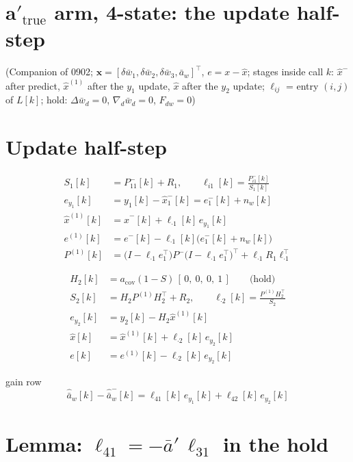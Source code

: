 \documentclass[11pt,a4paper,fontset=none]{ctexart}
\newcommand{\ba}{\bar{a}}
\newcommand{\bw}{\bar{w}}
\begin{document}
\section*{a$'_{\mathrm{true}}$ arm, 4-state: the update half-step}

(Companion of 0902; $\mathbf{x} = [\delta\bw_1, \delta\bw_2, \delta\bw_3, \ba_w]^{\top}$, $e = x - \hat{x}$;
stages inside call $k$: $\hat{x}^{-}$ after predict, $\hat{x}^{(1)}$ after the $y_1$ update, $\hat{x}$ after the $y_2$ update;
$\ell_{ij}$ = entry $(i,j)$ of $L[k]$; hold: $\Delta\bw_d = 0$, $\nabla_d\bw_d = 0$, $F_{dw} = 0$)

\section{Update half-step}

\begin{align*}
S_1[k] &= P^{-}_{11}[k] + R_1 , \qquad \ell_{i1}[k] = \frac{P^{-}_{i1}[k]}{S_1[k]} \\
e_{y_1}[k] &= y_1[k] - \hat{x}_1^{-}[k] = e_1^{-}[k] + n_w[k] \\
\hat{x}^{(1)}[k] &= \hat{x}^{-}[k] + \ell_{\cdot 1}[k]\,e_{y_1}[k] \\
e^{(1)}[k] &= e^{-}[k] - \ell_{\cdot 1}[k]\bigl(e_1^{-}[k] + n_w[k]\bigr) \\
P^{(1)}[k] &= \bigl(I - \ell_{\cdot 1}e_1^{\top}\bigr)P^{-}\bigl(I - \ell_{\cdot 1}e_1^{\top}\bigr)^{\top} + \ell_{\cdot 1}R_1\ell_{\cdot 1}^{\top}
\end{align*}

\begin{align*}
H_2[k] &= a_{\mathrm{cov}}(1-S)\,[\,0,\ 0,\ 0,\ 1\,] \qquad \text{(hold)} \\
S_2[k] &= H_2P^{(1)}H_2^{\top} + R_2 , \qquad \ell_{\cdot 2}[k] = \frac{P^{(1)}H_2^{\top}}{S_2} \\
e_{y_2}[k] &= y_2[k] - H_2\hat{x}^{(1)}[k] \\
\hat{x}[k] &= \hat{x}^{(1)}[k] + \ell_{\cdot 2}[k]\,e_{y_2}[k] \\
e[k] &= e^{(1)}[k] - \ell_{\cdot 2}[k]\,e_{y_2}[k]
\end{align*}

gain row
\begin{equation*}
\hat{\ba}_w[k] - \hat{\ba}_w^{-}[k] = \ell_{41}[k]\,e_{y_1}[k] + \ell_{42}[k]\,e_{y_2}[k]
\end{equation*}

\section{Lemma: $\ell_{41} = -\ba'\,\ell_{31}$ in the hold}
\end{document}
